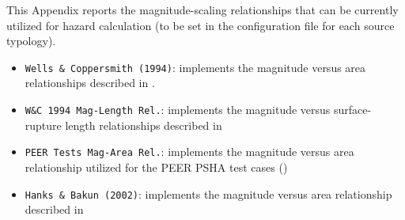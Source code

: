 \label{app:msr}
This Appendix reports the magnitude-scaling relationships that can be currently utilized for hazard calculation (to be set in the configuration file for each source typology).
\begin{itemize}
\item \Verb+Wells & Coppersmith (1994)+: implements the magnitude versus area relationships described in \cite{wells1994}.
\item \Verb+W&C 1994 Mag-Length Rel.+: implements the magnitude versus surface-rupture length relationships described in \cite{wells1994}
\item \Verb+PEER Tests Mag-Area Rel.+: implements the magnitude versus area relationship utilized for the PEER PSHA test cases (\cite{thomas2010})
\item \Verb+Hanks & Bakun (2002)+: implements the magnitude versus area relationship described in \cite{hanks2002}
\end{itemize}
